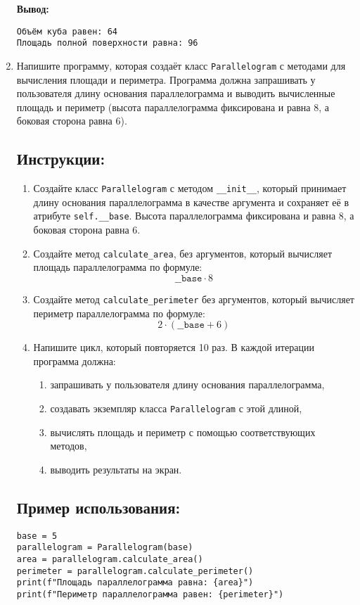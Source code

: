 \begin{enumerate}
\textbf{Вывод:}
\begin{verbatim}
Объём куба равен: 64
Площадь полной поверхности равна: 96
\end{verbatim}

\item
Напишите программу, которая создаёт класс \texttt{Parallelogram} с методами для вычисления площади
и периметра. Программа должна запрашивать у пользователя длину основания параллелограмма
и выводить вычисленные площадь и периметр (высота параллелограмма фиксирована и равна 8, 
а боковая сторона равна 6).

\subsection*{Инструкции:}
\begin{enumerate}
\item Создайте класс \texttt{Parallelogram} с методом
\texttt{\_\_init\_\_}, который принимает длину основания параллелограмма в
качестве аргумента и сохраняет её в атрибуте \texttt{self.\_\_base}.
Высота параллелограмма фиксирована и равна 8, а боковая сторона равна 6.

\item Создайте метод \texttt{calculate\_area},
без аргументов, который вычисляет площадь параллелограмма по формуле:
\[
\texttt{\_\_base} \cdot 8
\]

\item Создайте метод \texttt{calculate\_perimeter} без аргументов,
который вычисляет периметр параллелограмма по формуле:
\[
2 \cdot (\texttt{\_\_base} + 6)
\]

\item Напишите цикл, который повторяется 10 раз. В каждой итерации программа должна:
\begin{enumerate}
\item запрашивать у пользователя длину основания параллелограмма,
\item создавать экземпляр класса \texttt{Parallelogram} с этой длиной,
\item вычислять площадь и периметр с помощью соответствующих методов,
\item выводить результаты на экран.
\end{enumerate}
\end{enumerate}

\subsection*{Пример использования:}
\begin{verbatim}
base = 5
parallelogram = Parallelogram(base)
area = parallelogram.calculate_area()
perimeter = parallelogram.calculate_perimeter()
print(f"Площадь параллелограмма равна: {area}")
print(f"Периметр параллелограмма равен: {perimeter}")
\end{verbatim}


\end{enumerate}
